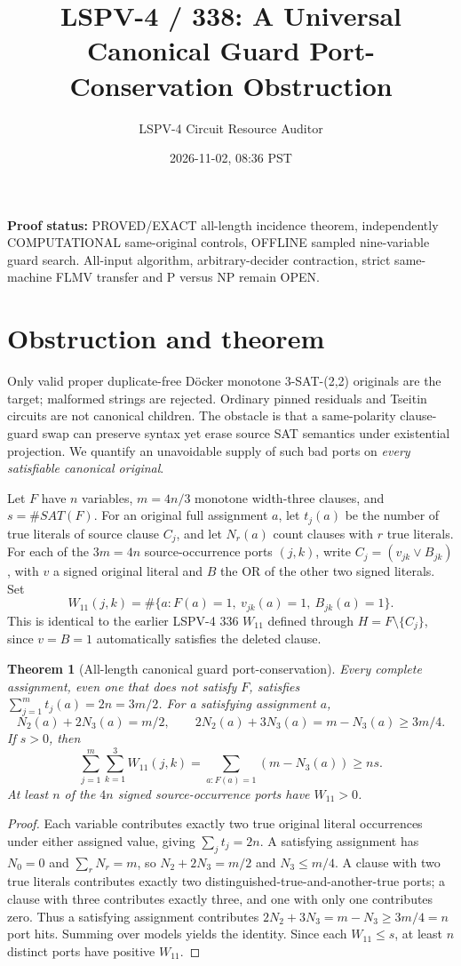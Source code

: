 \documentclass[11pt]{article}
\title{LSPV-4 / 338: A Universal Canonical Guard Port-Conservation Obstruction}
\author{LSPV-4 Circuit Resource Auditor}
\date{2026-11-02, 08:36 PST}
\newtheorem{theorem}{Theorem}
\begin{document}
\maketitle
\noindent\textbf{Proof status:} PROVED/EXACT all-length incidence theorem, independently COMPUTATIONAL same-original controls, OFFLINE sampled nine-variable guard search. All-input algorithm, arbitrary-decider contraction, strict same-machine FLMV transfer and P versus NP remain OPEN.

\section{Obstruction and theorem}
Only valid proper duplicate-free D\"ocker monotone 3-SAT-(2,2) originals are the target; malformed strings are rejected. Ordinary pinned residuals and Tseitin circuits are not canonical children. The obstacle is that a same-polarity clause-guard swap can preserve syntax yet erase source SAT semantics under existential projection. We quantify an unavoidable supply of such bad ports on \emph{every satisfiable canonical original}.

Let $F$ have $n$ variables, $m=4n/3$ monotone width-three clauses, and $s=\#SAT(F)$. For an original full assignment $a$, let $t_j(a)$ be the number of true literals of source clause $C_j$, and let $N_r(a)$ count clauses with $r$ true literals. For each of the $3m=4n$ source-occurrence ports $(j,k)$, write $C_j=(v_{jk}\vee B_{jk})$, with $v$ a signed original literal and $B$ the OR of the other two signed literals. Set
\[
W_{11}(j,k)=\#\{a:F(a)=1,\ v_{jk}(a)=1,\ B_{jk}(a)=1\}.
\]
This is identical to the earlier LSPV-4 336 $W_{11}$ defined through $H=F\setminus\{C_j\}$, since $v=B=1$ automatically satisfies the deleted clause.

\begin{theorem}[All-length canonical guard port-conservation]
Every complete assignment, even one that does not satisfy $F$, satisfies
$\sum_{j=1}^m t_j(a)=2n=3m/2$.
For a satisfying assignment $a$,
\[
N_2(a)+2N_3(a)=m/2,\qquad
2N_2(a)+3N_3(a)=m-N_3(a)\ge 3m/4.
\]
If $s>0$, then
\[
\boxed{\sum_{j=1}^m\sum_{k=1}^{3}W_{11}(j,k)
=\sum_{a:F(a)=1}(m-N_3(a))\ge ns.}
\]
At least $n$ of the $4n$ signed source-occurrence ports have $W_{11}>0$.
\end{theorem}
\begin{proof}
Each variable contributes exactly two true original literal occurrences under either assigned value, giving $\sum_jt_j=2n$. A satisfying assignment has $N_0=0$ and $\sum_rN_r=m$, so $N_2+2N_3=m/2$ and $N_3\le m/4$. A clause with two true literals contributes exactly two distinguished-true-and-another-true ports; a clause with three contributes exactly three, and one with only one contributes zero. Thus a satisfying assignment contributes $2N_2+3N_3=m-N_3\ge3m/4=n$ port hits. Summing over models yields the identity. Since each $W_{11}\le s$, at least $n$ distinct ports have positive $W_{11}$.
\end{proof}
\end{document}
